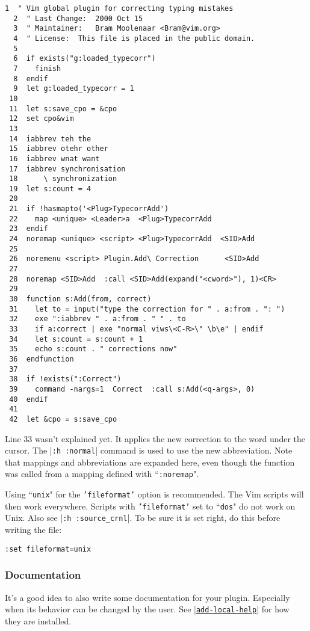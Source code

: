 \begin{Verbatim}[samepage=true]
  1  " Vim global plugin for correcting typing mistakes
  2  " Last Change:  2000 Oct 15
  3  " Maintainer:   Bram Moolenaar <Bram@vim.org>
  4  " License:  This file is placed in the public domain.
  5
  6  if exists("g:loaded_typecorr")
  7    finish
  8  endif
  9  let g:loaded_typecorr = 1
 10
 11  let s:save_cpo = &cpo
 12  set cpo&vim
 13
 14  iabbrev teh the
 15  iabbrev otehr other
 16  iabbrev wnat want
 17  iabbrev synchronisation
 18      \ synchronization
 19  let s:count = 4
 20
 21  if !hasmapto('<Plug>TypecorrAdd')
 22    map <unique> <Leader>a  <Plug>TypecorrAdd
 23  endif
 24  noremap <unique> <script> <Plug>TypecorrAdd  <SID>Add
 25
 26  noremenu <script> Plugin.Add\ Correction      <SID>Add
 27
 28  noremap <SID>Add  :call <SID>Add(expand("<cword>"), 1)<CR>
 29
 30  function s:Add(from, correct)
 31    let to = input("type the correction for " . a:from . ": ")
 32    exe ":iabbrev " . a:from . " " . to
 33    if a:correct | exe "normal viws\<C-R>\" \b\e" | endif
 34    let s:count = s:count + 1
 35    echo s:count . " corrections now"
 36  endfunction
 37
 38  if !exists(":Correct")
 39    command -nargs=1  Correct  :call s:Add(<q-args>, 0)
 40  endif
 41
 42  let &cpo = s:save_cpo
\end{Verbatim}

Line 33 wasn't explained yet.
It applies the new correction to the word under the cursor.
The |\texttt{:h :normal}| command is used to use the new abbreviation.
Note that mappings and abbreviations are expanded here, even though the function was called from a mapping defined with ``\texttt{:noremap}".

Using ``\texttt{unix}" for the \texttt{'fileformat'} option is recommended.
The Vim scripts will then work everywhere.
Scripts with \texttt{'fileformat'} set to ``\texttt{dos}" do not work on Unix.
Also see |\texttt{:h :source\_crnl}|.
To be sure it is set right, do this before writing the file:

\begin{Verbatim}[samepage=true]
 :set fileformat=unix
\end{Verbatim}

\subsubsection{Documentation}
\label{write-local-help}
It's a good idea to also write some documentation for your plugin.
Especially when its behavior can be changed by the user.
See \hyperref[add-local-help]{|\texttt{add-local-help}|} for how they are installed.

